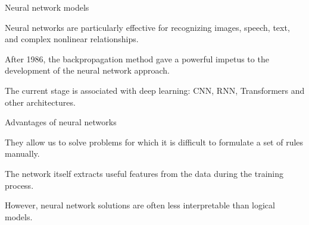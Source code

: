 \begin{frame}{Neural network models}
	\topline
	\justifying
	
	\begin{textitemize}
		\item Neural networks are particularly effective for recognizing images, speech, text, and complex nonlinear relationships.
		\item After 1986, the backpropagation method gave a powerful impetus to the development of the neural network approach.
		\item The current stage is associated with deep learning: CNN, RNN, Transformers and other architectures.
	\end{textitemize}
\end{frame}

\begin{frame}{Advantages of neural networks}
	\topline
	\justifying
	
	\begin{textitemize}
		\item They allow us to solve problems for which it is difficult to formulate a set of rules manually.
		\item The network itself extracts useful features from the data during the training process.
		\item However, neural network solutions are often less interpretable than logical models.
	\end{textitemize}
\end{frame}

